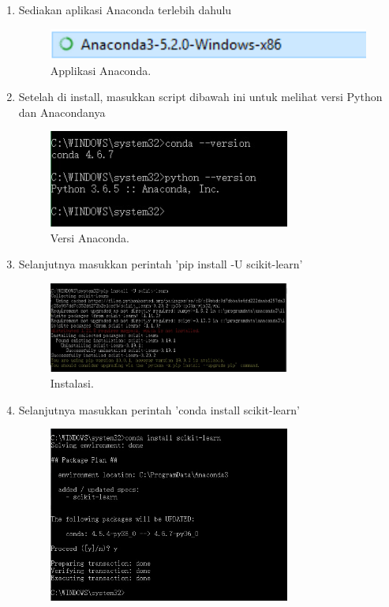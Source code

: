 \begin{enumerate}
\item Sediakan aplikasi Anaconda terlebih dahulu
\begin{figure}[ht]
\centerline{\includegraphics[width=1\textwidth]{figures/0.PNG}}
\caption{Applikasi Anaconda.}
\end{figure}
\item Setelah di install, masukkan script dibawah ini untuk melihat versi Python dan Anacondanya
\begin{figure}[ht]
\centerline{\includegraphics[width=0.75\textwidth]{figures/1.JPEG}}
\caption{Versi Anaconda.}
\end{figure}
\item  Selanjutnya masukkan perintah 'pip install -U scikit-learn'
\begin{figure}[ht]
\centerline{\includegraphics[width=0.75\textwidth]{figures/2.JPEG}}
\caption{Instalasi.}
\end{figure}
\item  Selanjutnya masukkan perintah 'conda install  scikit-learn'
\begin{figure}[ht]
\centerline{\includegraphics[width=0.75\textwidth]{figures/3.JPEG}}

\end{figure}
\end{enumerate}
